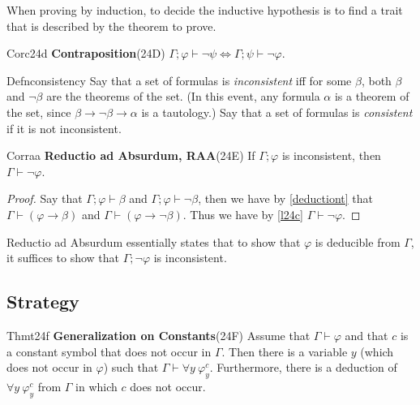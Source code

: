 When proving by induction, to decide the inductive hypothesis is to find a trait that is described by the theorem to prove.

\begin{reference}{Cor}{c24d}
  \textbf{Contraposition}\quad (24D) $\Gamma;\varphi\vdash\neg \psi \Leftrightarrow \Gamma;\psi\vdash\neg \varphi$.
\end{reference}

\begin{reference}{Defn}{consistency}
  Say that a set of formulas is \textit{inconsistent} iff for some $\beta$, both $\beta$ and $\neg \beta$ are the theorems of the set. (In this event, any formula $\alpha$ is a theorem of the set, since $\beta\rightarrow\neg \beta\rightarrow \alpha$ is a tautology.) Say that a set of formulas is \textit{consistent} if it is not inconsistent.
\end{reference}

\begin{reference}{Cor}{raa}
  \textbf{Reductio ad Absurdum, RAA}\quad (24E) If $\Gamma;\varphi$ is inconsistent, then $\Gamma\vdash\neg \varphi$.
\end{reference}

\begin{proof}
  Say that $\Gamma;\varphi\vdash \beta$ and $\Gamma;\varphi\vdash\neg \beta$, then we have by \ref{deductiont} that $\Gamma\vdash(\varphi\rightarrow \beta)$ and $\Gamma\vdash(\varphi\rightarrow \neg\beta)$. Thus we have by \ref{l24c} $\Gamma\vdash\neg \varphi$.
\end{proof}

Reductio ad Absurdum essentially states that to show that $\varphi$ is deducible from $\Gamma$, it suffices to show that $\Gamma;\neg\varphi$ is inconsistent.

\subsection*{Strategy}

\begin{reference}{Thm}{t24f}
  \textbf{Generalization on Constants}\quad (24F) Assume that $\Gamma\vdash \varphi$ and that $c$ is a constant symbol that does not occur in $\Gamma$. Then there is a variable $y$ (which does not occur in $\varphi$) such that $\Gamma\vdash\forall y\ \varphi_y^c.$ Furthermore, there is a deduction of $\forall y\ \varphi_y^c$ from $\Gamma$ in which $c$ does not occur.
\end{reference}

